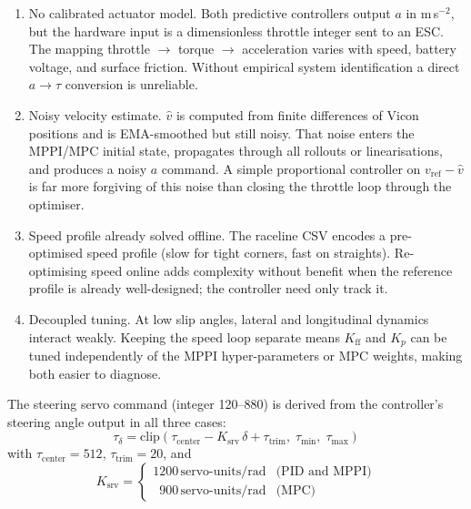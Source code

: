 \documentclass[11pt]{article}
\begin{document}
\begin{enumerate}
  \item No calibrated actuator model.  Both predictive controllers
        output $a$ in m\,s$^{-2}$, but the hardware input is a dimensionless
        throttle integer sent to an ESC.  The mapping throttle $\to$ torque
        $\to$ acceleration varies with speed, battery voltage, and surface
        friction.  Without empirical system identification a direct
        $a \to \tau$ conversion is unreliable.

  \item Noisy velocity estimate.  $\hat{v}$ is computed from finite
        differences of Vicon positions and is EMA-smoothed but still noisy.
        That noise enters the MPPI/MPC initial state, propagates through all
        rollouts or linearisations, and produces a noisy $a$ command.  A simple
        proportional controller on $v_{\mathrm{ref}} - \hat{v}$ is far more
        forgiving of this noise than closing the throttle loop through the
        optimiser.

  \item Speed profile already solved offline.  The raceline CSV encodes
        a pre-optimised speed profile (slow for tight corners, fast on
        straights).  Re-optimising speed online adds complexity without benefit
        when the reference profile is already well-designed; the controller
        need only track it.

  \item Decoupled tuning.  At low slip angles, lateral and longitudinal
        dynamics interact weakly.  Keeping the speed loop separate means
        $K_{\mathrm{ff}}$ and $K_p$ can be tuned independently of the MPPI
        hyper-parameters or MPC weights, making both easier to diagnose.
\end{enumerate}

\medskip

The steering servo command (integer 120--880) is derived from the controller's
steering angle output in all three cases:
\[
\tau_{\delta} = \mathrm{clip}\!\left(\tau_{\text{center}} - K_{\text{srv}}\,\delta + \tau_{\text{trim}},\;
  \tau_{\min},\; \tau_{\max}\right)
\]
with $\tau_{\text{center}} = 512$, $\tau_{\text{trim}} = 20$, and
\[
K_{\text{srv}} = \begin{cases}
1200\,\text{servo-units/rad} & \text{(PID and MPPI)} \\
\phantom{0}900\,\text{servo-units/rad} & \text{(MPC)}
\end{cases}
\]
\end{document}
